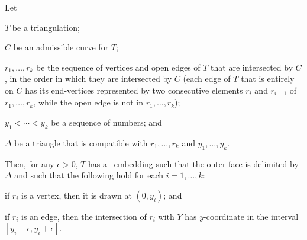 \begin{thm}
	Let
	\begin{compactenum}
		\item $T$ be a triangulation;
		\item $C$ be an admissible curve for $T$;
		\item $r_1,\ldots,r_k$ be the sequence of vertices and open edges
		of $T$ that are intersected by $C$, in the order in which they are intersected by $C$ (each edge of $T$ that is entirely on $C$ has its end-vertices represented by two consecutive elements $r_i$ and $r_{i+1}$ of $r_1,\ldots,r_k$, while the open edge is not in $r_1,\ldots,r_k$);
		\item $y_1<\cdots<y_k$ be a sequence of numbers; and
		\item $\Delta$ be a triangle that is compatible with 
		$r_1,\ldots,r_k$ and $y_1,\ldots,y_k$.
	\end{compactenum}
	Then, for any $\epsilon>0$, $T$ has a \Fary\ embedding such that the outer face is delimited by $\Delta$ and such that the following hold for each $i=1,\ldots,k$: 
	\begin{compactenum}
		\item if $r_i$ is a vertex, then it is drawn at $(0,y_i)$; and
		\item if $r_i$ is an edge, then the intersection of $r_i$ with $Y$ has $y$-coordinate in the interval $[y_i-\epsilon,y_i+\epsilon]$.
	\end{compactenum}
\end{thm}

